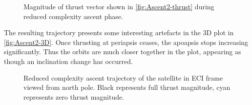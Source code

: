 \begin{figure}
\centering
\def\svgwidth{\figurewidth}

\caption{Magnitude of thrust vector shown in \autoref{fig:Ascent2-thrust} during reduced complexity ascent phase.} \label{fig:Ascent2-thrustM}
\end{figure}

The resulting trajectory presents some interesting artefacts in the 3D plot in \autoref{fig:Ascent2-3D}. Once thrusting at periapsis ceases, the apoapsis stops increasing significantly. Thus the orbits are much closer together in the plot, appearing as though an inclination change has occurred.

\begin{figure}
\centering
\def\svgwidth{\figurewidth}

\caption{Reduced complexity ascent trajectory of the satellite in ECI frame viewed from north pole. Black represents full thrust magnitude, cyan represents zero thrust magnitude.} \label{fig:Ascent2-3D}
\end{figure}

%
%
%
%
%
%
%
%
%
%
%

